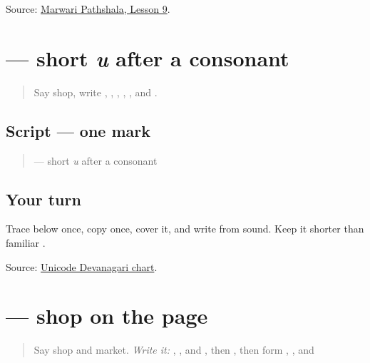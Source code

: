 \begin{tcolorbox}[breakable,colback=teal!4,colframe=teal!35!black,title={Before you move on}]
Source: \href{https://www.marwaripathshala.com/marwari-lesson-9-english}{Marwari Pathshala, Lesson 9}.
\end{tcolorbox}
\section[\texorpdfstring{\mw{ु} (u)}{ु (u)}]{ — short \emph{u} after a consonant}

\label{lesson:MW-W13-u-matra}



\begin{quote}
Say shop, write \textbf{}, \textbf{}, \textbf{}, \textbf{}, \textbf{}, and \textbf{}.
\end{quote}

\subsection*{Script — one mark}

\begin{quote}
\textbf{} — short \emph{u} after a consonant
\end{quote}

\subsection*{Your turn}
Trace \textbf{} below \textbf{} once, copy \textbf{} once, cover it, and write \textbf{} from sound. Keep it shorter than familiar \textbf{}.

\begin{tcolorbox}[breakable,colback=teal!4,colframe=teal!35!black,title={Before you move on}]
Source: \href{https://www.unicode.org/charts/PDF/U0900.pdf}{Unicode Devanagari chart}.
\end{tcolorbox}
\section[\texorpdfstring{\mw{दुकान} (dukān)}{दुकान (dukān)}]{ — shop on the page}

\label{lesson:MW-C13-dukan}



\begin{quote}
Say shop and market. \emph{Write it:} \textbf{}, \textbf{}, and \textbf{}, then \textbf{ }, then form \textbf{}, \textbf{}, and \textbf{}
\end{quote}

